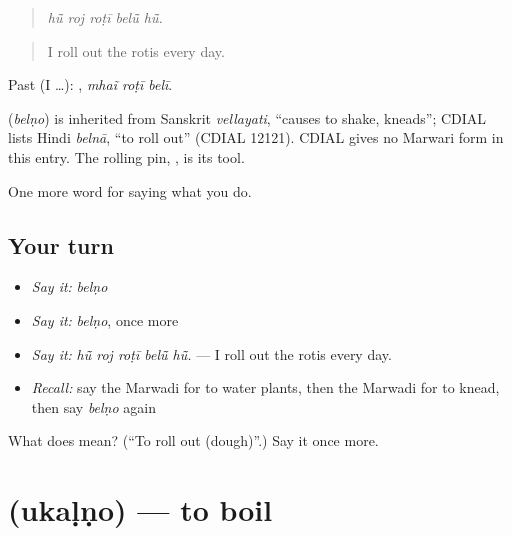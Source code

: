 \begin{quote}
    
\end{quote}

\begin{quote}
\emph{hū̃ roj roṭī belū̃ hū̃.}
\end{quote}

\begin{quote}
I roll out the rotis every day.
\end{quote}

Past (I …):   , \emph{mhaĩ roṭī belī}.

\begin{cousinweb}
\textbf{} (\emph{belṇo}) is inherited from Sanskrit \emph{vellayati}, \textquotedblleft{}causes to shake, kneads\textquotedblright{}; CDIAL lists Hindi \emph{belnā}, \textquotedblleft{}to roll out\textquotedblright{} (CDIAL 12121). CDIAL gives no Marwari form in this entry. The rolling pin, \textbf{}, is its tool.
\end{cousinweb}

\begin{grammarlens}[title={What you've built}]
One more word for saying what you do.
\end{grammarlens}

\subsection*{Your turn}
\begin{itemize}
\raggedright
  \item \emph{Say it:} \emph{belṇo}
  \item \emph{Say it:} \emph{belṇo}, once more
  \item \emph{Say it:} \emph{hū̃ roj roṭī belū̃ hū̃.} — I roll out the rotis every day.
  \item \emph{Recall:} say the Marwadi for to water plants, then the Marwadi for to knead, then say \emph{belṇo} again
\end{itemize}

\begin{tcolorbox}[breakable,colback=teal!4,colframe=teal!35!black,title={Before you move on}]
What does  mean? (\textquotedblleft{}To roll out (dough)\textquotedblright{}.) Say it once more.
\end{tcolorbox}
\section[\texorpdfstring{\mw{उकळणो} (ukaḷṇo)}{उकळणो (ukaḷṇo)}]{ (ukaḷṇo) — to boil}

